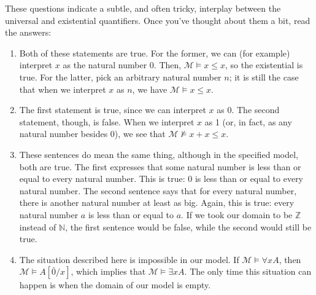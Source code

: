 \documentclass[letterpaper,10pt,english]{sphinxmanual}
\begin{document}
\sphinxAtStartPar
These questions indicate a subtle, and often tricky, interplay between the universal and existential quantifiers. Once you’ve thought about them a bit, read the answers:
\begin{enumerate}
%
\item {} 
\sphinxAtStartPar
Both of these statements are true. For the former, we can (for example) interpret \(x\) as the natural number 0. Then, \({\mathcal M} \models x \leq x\), so the existential is true. For the latter, pick an arbitrary natural number \(n\); it is still the case that when we interpret \(x\) as \(n\), we have \({\mathcal M} \models x \leq x\).

\item {} 
\sphinxAtStartPar
The first statement is true, since we can interpret \(x\) as 0. The second statement, though, is false. When we interpret \(x\) as 1 (or, in fact, as any natural number besides 0), we see that \({\mathcal M} \not \models x + x \leq x\).

\item {} 
\sphinxAtStartPar
These sentences do  mean the same thing, although in the specified model, both are true. The first expresses that some natural number is less than or equal to every natural number. This is true: 0 is less than or equal to every natural number. The second sentence says that for every natural number, there is another natural number at least as big. Again, this is true: every natural number \(a\) is less than or equal to \(a\). If we took our domain to be \({\mathbb Z}\) instead of \({\mathbb N}\), the first sentence would be false, while the second would still be true.

\item {} 
\sphinxAtStartPar
The situation described here is impossible in our model. If \({\mathcal M} \models \forall x A\), then \({\mathcal M} \models A [\bar 0 / x]\), which implies that \({\mathcal M} \models \exists x A\). The only time this situation can happen is when the domain of our model is empty.

\end{enumerate}
\end{document}
